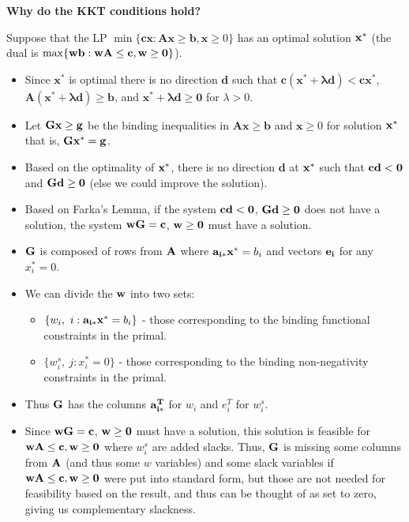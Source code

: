 {\bf Why do the KKT conditions hold?}

\vspace{3mm}
Suppose that the LP $\min\{\mathbf{cx}: \mathbf{Ax} \ge \mathbf{b}, \mathbf{x} \ge 0\}$ has an optimal solution ${\bf x^*}$ (the dual is $\max\{{\bf wb}: {\bf wA} \le {\bf c}, {\bf w} \ge {\bf 0}\}$).

\begin{itemize}
\item Since $\mathbf{x^*}$ is optimal there is no direction $\mathbf{d}$ such that $\mathbf{c(x^* + \lambda d)} < \mathbf{cx^*}$, $\mathbf{A(x^*+ \lambda d)} \ge \mathbf{b}$, and $\mathbf{x^*+ \lambda d} \ge \mathbf{0}$ for $\lambda > 0$.
\item Let ${\bf Gx } \ge {\bf g}$ be the binding inequalities in $\mathbf{Ax} \ge \mathbf{b}$ and $\mathbf{x} \ge 0$ for solution ${\bf x^*}$ that is, ${\bf Gx^*} = {\bf g}$. 
\item Based on the optimality of ${\bf x^*}$, there is no direction $\mathbf{d}$ at ${\bf x^*}$ such that ${\bf cd} < {\bf 0}$ and ${\bf Gd} \ge {\bf 0}$ (else we could improve the solution).
\item Based on Farka's Lemma, if the system ${\bf cd} < {\bf 0}$, ${\bf Gd} \ge {\bf 0}$ does not have a solution, the system ${\bf wG} = {\bf c}$, ${\bf w} \ge {\bf 0}$ must have a solution.
\item ${\bf G}$ is composed of rows from ${\bf A}$  where ${\bf a_{i*}x^*}=b_i$ and vectors ${\bf e_{i}}$ for any $x^*_i = 0$.
\item We can divide the ${\bf w}$ into two sets:
\begin{itemize}
\item  $\{w_i,~ i:{\bf a_{i*}x^*}=b_i\}$ - those corresponding to the binding functional constraints in the primal.
\item  $\{w^s_i,~ j:x^*_i=0\}$ - those corresponding to the binding non-negativity constraints in the primal.
\end{itemize}
\item Thus ${\bf G}$ has the columns ${\bf a_{i*}^T}$ for $w_i$ and $e_{i}^T$ for $w^s_i$.
\item Since  ${\bf wG} = {\bf c}$, ${\bf w} \ge {\bf 0}$ must have a solution, this solution is feasible for ${\bf wA} \le {\bf c}, {\bf w} \ge {\bf 0}$ where $w^s_i$ are added slacks. Thus,  ${\bf G}$ is missing some columns from ${\bf A}$ (and thus some $w$ variables) and some slack variables if ${\bf wA} \le {\bf c}, {\bf w} \ge {\bf 0}$ were put into standard form, but those are not needed for feasibility based on the result, and thus can be thought of as set to zero, giving us complementary slackness.
\end{itemize}






